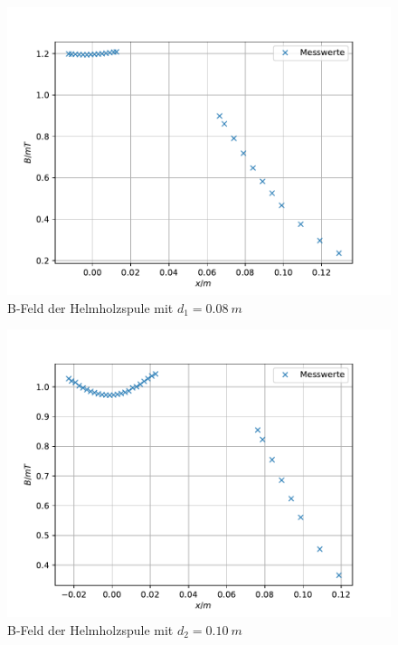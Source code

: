 
\begin{figure}[h!]
  \centering
  \includegraphics[width=\textwidth]{Helm8.pdf}
  \caption{B-Feld der Helmholzspule mit $d_{1}=\SI{0.08}{m}$}
  \label{fig:h8}
\end{figure}


\begin{figure}[h!]
  \centering
  \includegraphics[width=\textwidth]{Helm10.pdf}
  \caption{B-Feld der Helmholzspule mit $d_{2}=\SI{0.10}{m}$}
  \label{fig:h10}
\end{figure}

